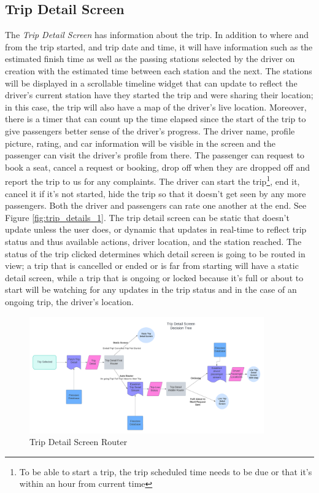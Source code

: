 \documentclass[a4paper, 12pt]{report} %
\begin{document}
        \subsection{Trip Detail Screen}
            The \textit{Trip Detail Screen} has information about the trip. In addition to where and from the trip started, and trip date and time, it will have information such as the estimated finish time as well as the passing stations selected by the driver on creation with the estimated time between each station and the next. The stations will be displayed in a scrollable timeline widget that can update to reflect the driver's current station have they started the trip and were sharing their location; in this case, the trip will also have a map of the driver's live location. Moreover, there is a timer that can count up the time elapsed since the start of the trip to give passengers better sense of the driver's progress. The driver name, profile picture, rating, and car information will be visible in the screen and the passenger can visit the driver's profile from there. The passenger can request to book a seat, cancel a request or booking, drop off when they are dropped off and report the trip to us for any complaints. The driver can start the trip\footnote{To be able to start a trip, the trip scheduled time needs to be due or that it's within an hour from current time}, end it, cancel it if it's not started, hide the trip so that it doesn't get seen by any more passengers. Both the driver and passengers can rate one another at the end. See Figure \ref{fig:trip_details_1}. The trip detail screen can be static that doesn't update unless the user does, or dynamic that updates in real-time to reflect trip status and thus available actions, driver location, and the station reached. The status of the trip clicked determines which detail screen is going to be routed in view; a trip that is cancelled or ended or is far from starting will have a static detail screen, while a trip that is ongoing or locked because it's full or about to start will be watching for any updates in the trip status and in the case of an ongoing trip, the driver's location.

            \begin{figure}
                \centering
                \includegraphics[width=0.9\textwidth]{Images/trip_detail_screen_variations.png}
                \caption{Trip Detail Screen Router}
                \label{fig:trip_detail_screen_variations}
            \end{figure}
\end{document}
